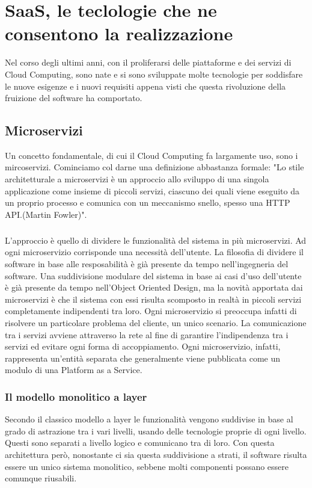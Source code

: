 \chapter{SaaS, le teclologie che ne consentono la realizzazione}
Nel corso degli ultimi anni, con il proliferarsi delle piattaforme e dei servizi di Cloud Computing, sono nate e si sono sviluppate molte tecnologie per soddisfare le nuove esigenze e i nuovi requisiti appena visti che questa rivoluzione della fruizione del software ha comportato.

\section{Microservizi}
Un concetto fondamentale, di cui il Cloud Computing fa largamente uso, sono i mircoservizi. Cominciamo col darne una definizione abbastanza formale: "Lo stile architetturale a microservizi è un approccio allo sviluppo di una singola applicazione come insieme di piccoli servizi, ciascuno dei quali viene eseguito da un proprio processo e comunica con un meccanismo snello, spesso una HTTP API.(Martin Fowler)".

\paragraph{}
L'approccio è quello di dividere le funzionalità del sistema in più microservizi. Ad ogni microservizio corrisponde una necessità dell'utente. La filosofia di dividere il software in base alle resposabilità è già presente da tempo nell'ingegneria del software. Una suddivisione modulare del sistema in base ai casi d'uso dell'utente è già presente da tempo nell'Object Oriented Design, ma la novità apportata dai microservizi è che il sistema con essi risulta scomposto in realtà in piccoli servizi completamente indipendenti tra loro. Ogni microservizio si preoccupa infatti di risolvere un particolare problema del cliente, un unico scenario. La comunicazione tra i servizi avviene attraverso la rete al fine di garantire l’indipendenza tra i servizi ed evitare ogni forma di accoppiamento. Ogni microservizio, infatti, rappresenta un'entità separata che generalmente viene pubblicata come un modulo di una Platform as a Service.

\subsection{Il modello monolitico a layer }
Secondo il classico modello a layer le funzionalità vengono suddivise in base al grado di astrazione tra i vari livelli, usando delle tecnologie proprie di ogni livello. Questi sono separati a livello logico e comunicano tra di loro. Con questa architettura però, nonostante ci sia questa suddivisione a strati, il software risulta essere un unico sistema monolitico, sebbene molti componenti possano essere comunque riusabili.

